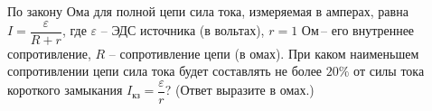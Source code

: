 \begin{ex}
	\begin{condition}
		По закону Ома для полной цепи сила тока, измеряемая в амперах, равна \( I=\dfrac{\varepsilon}{R+r} \), где \( \varepsilon \)  -- ЭДС источника (в вольтах), \( r = 1 \) Ом -- его внутреннее сопротивление, \( R \) -- сопротивление цепи (в омах). При каком наименьшем сопротивлении цепи сила тока будет составлять не более \( 20\% \) от силы тока короткого замыкания \( I_{\text{кз}}=\dfrac{\varepsilon}{r} \)? (Ответ выразите в омах.)
	\end{condition}
\end{ex}